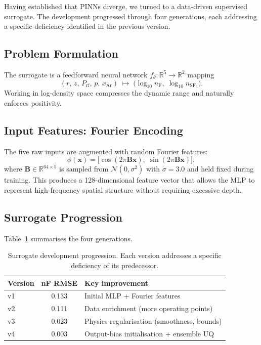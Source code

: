\documentclass[12pt,a4paper]{article}
\begin{document}
Having established that PINNs diverge, we turned to a data-driven
supervised surrogate.  The development progressed through four
generations, each addressing a specific deficiency identified in the
previous version.

\subsection{Problem Formulation}

The surrogate is a feedforward neural network
$f_\theta : \mathbb{R}^5 \to \mathbb{R}^2$ mapping
\begin{equation}
  (r,\, z,\, P_{\text{rf}},\, p,\, x_{\text{Ar}})
  \;\longmapsto\;
  \bigl(\log_{10} n_{\text{F}},\;
         \log_{10} n_{\text{SF}_6}\bigr).
  \label{eq:surrogate_map}
\end{equation}
Working in log-density space compresses the dynamic range and
naturally enforces positivity.

\subsection{Input Features: Fourier Encoding}

The five raw inputs are augmented with random Fourier features:
\begin{equation}
  \phi(\mathbf{x}) =
  \bigl[\cos(2\pi \mathbf{B}\mathbf{x}),\;
         \sin(2\pi \mathbf{B}\mathbf{x})\bigr],
  \label{eq:fourier}
\end{equation}
where $\mathbf{B} \in \mathbb{R}^{64 \times 5}$ is sampled from
$\mathcal{N}(0, \sigma^2)$ with $\sigma = 3.0$ and held fixed during
training.  This produces a 128-dimensional feature vector that
allows the MLP to represent high-frequency spatial structure
without requiring excessive depth.

\subsection{Surrogate Progression}

Table~\ref{tab:progression} summarises the four generations.

\begin{table}[H]
  \centering
  \caption{Surrogate development progression.  Each version
           addresses a specific deficiency of its predecessor.}
  \label{tab:progression}
  \begin{tabular}{lcl}
    \toprule
    Version & nF RMSE & Key improvement \\
    \midrule
    v1 & 0.133 & Initial MLP + Fourier features \\
    v2 & 0.111 & Data enrichment (more operating points) \\
    v3 & 0.023 & Physics regularisation (smoothness, bounds) \\
    v4 & 0.003 & Output-bias initialisation + ensemble UQ \\
    \bottomrule
  \end{tabular}
\end{table}
\end{document}
